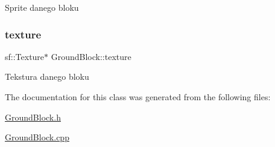 Sprite danego bloku \mbox{\label{class_ground_block_af610cda7ad96e934524a7bbdc13a64d6}} 
\subsubsection{\texorpdfstring{texture}{texture}}
{\footnotesize\ttfamily sf\+::\+Texture$\ast$ Ground\+Block\+::texture\hspace{0.3cm}{\ttfamily [protected]}}

Tekstura danego bloku 

The documentation for this class was generated from the following files\+:\begin{DoxyCompactItemize}
\item 
\hyperlink{_ground_block_8h}{Ground\+Block.\+h}\item 
\hyperlink{_ground_block_8cpp}{Ground\+Block.\+cpp}\end{DoxyCompactItemize}
